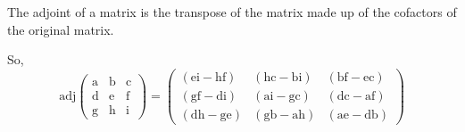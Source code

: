 The adjoint of a matrix is the transpose of the matrix made up of the cofactors of the original matrix.
\par
So, \[ \mathrm{adj} 
  \left ( \begin{array}{ccc}
  \mathrm{a} & \mathrm{b} & \mathrm{c} \\
  \mathrm{d} & \mathrm{e} & \mathrm{f} \\
  \mathrm{g} & \mathrm{h} & \mathrm{i} 
  \end{array} \right )
= \left ( \begin{array}{ccc} 
  \mathrm{(ei - hf)} & \mathrm{(hc - bi)} & \mathrm{(bf - ec)} \\
  \mathrm{(gf - di)} & \mathrm{(ai - gc)} & \mathrm{(dc - af)} \\
  \mathrm{(dh - ge)} & \mathrm{(gb - ah)} & \mathrm{(ae - db)}
  \end{array}
\right ) \]